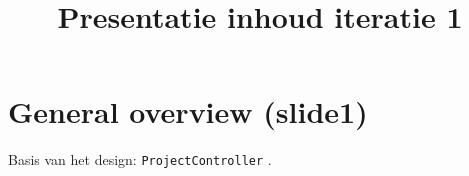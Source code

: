 \documentclass[11pt]{article}
\title{\textbf{Presentatie inhoud iteratie 1}}
\author{}
\date{}
\begin{document}
\maketitle

\section{General overview (slide1)}

Basis van het design: \texttt{ProjectController} . 
\end{document}
